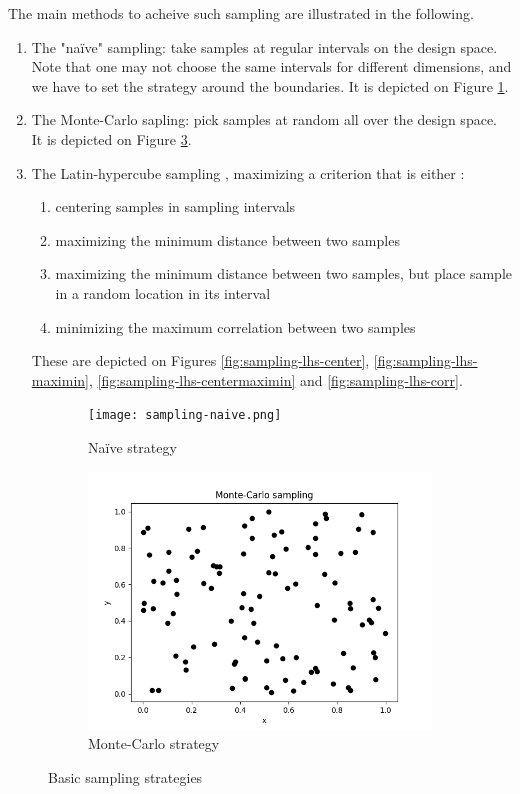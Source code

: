 The main methods to acheive such sampling are \cite{doe} illustrated in the following.
\begin{enumerate}
    \item The "naïve" sampling: take samples at regular intervals on the design space. Note that one may not choose the same intervals for different dimensions, and we have to set the strategy around the boundaries. It is depicted on Figure \ref{fig:sampling-naive}.
    \item The Monte-Carlo sapling: pick samples at random all over the design space. It is depicted on Figure \ref{fig:sampling-monte-carlo}.
    \item The Latin-hypercube sampling \cite{wiki-lhs}, maximizing a criterion that is either \cite{pydoe-docs}:
    \begin{enumerate}
        \item centering samples in sampling intervals
        \item maximizing the minimum distance between two samples
        \item maximizing the minimum distance between two samples, but place sample in a random location in its interval
        \item minimizing the maximum correlation between two samples
    \end{enumerate}
    These are depicted on Figures \ref{fig:sampling-lhs-center}, \ref{fig:sampling-lhs-maximin}, \ref{fig:sampling-lhs-centermaximin} and \ref{fig:sampling-lhs-corr}.
\end{enumerate}

\begin{figure}[h!]
    \centering
    \begin{subfigure}[b]{0.49\textwidth}
        \texttt{[image: sampling-naive.png]}
        \caption{Naïve strategy}
        \label{fig:sampling-naive}
    \end{subfigure}
    \hfill
    \begin{subfigure}[b]{0.49\textwidth}
        \includegraphics[width=\textwidth]{resources/images/sampling-monte-carlo.png}
        \caption{Monte-Carlo strategy}
        \label{fig:sampling-monte-carlo}
    \end{subfigure}
    \caption{Basic sampling strategies}
\end{figure}

